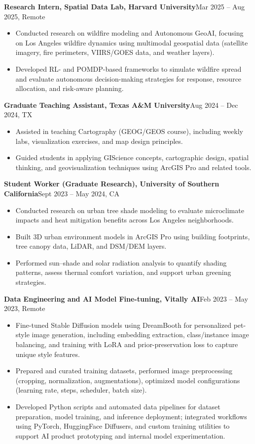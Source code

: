 \documentclass[10pt,letterpaper]{article}
\newcommand{\entry}[2]{%
  \par\vspace{0.30em}\noindent\textbf{#1}\hfill{\small #2}\par}
\newenvironment{tight}
  {\begin{itemize}[leftmargin=1.25em,itemsep=0.10em,topsep=0.20em,parsep=0pt,label=\textbullet]}
  {\end{itemize}}
\begin{document}
\entry{Research Intern, Spatial Data Lab, Harvard University}{Mar 2025 -- Aug 2025, Remote}
\begin{tight}
  \item Conducted research on wildfire modeling and Autonomous GeoAI, focusing on Los Angeles wildfire dynamics using multimodal geospatial data (satellite imagery, fire perimeters, VIIRS/GOES data, and weather layers).
  \item Developed RL- and POMDP-based frameworks to simulate wildfire spread and evaluate autonomous decision-making strategies for response, resource allocation, and risk-aware planning.
\end{tight}

\entry{Graduate Teaching Assistant, Texas A\&M University}{Aug 2024 -- Dec 2024, TX}
\begin{tight}
  \item Assisted in teaching Cartography (GEOG/GEOS course), including weekly labs, visualization exercises, and map design principles.
  \item Guided students in applying GIScience concepts, cartographic design, spatial thinking, and geovisualization techniques using ArcGIS Pro and related tools.
\end{tight}

\entry{Student Worker (Graduate Research), University of Southern California}{Sept 2023 -- May 2024, CA}
\begin{tight}
  \item Conducted research on urban tree shade modeling to evaluate microclimate impacts and heat mitigation benefits across Los Angeles neighborhoods.
  \item Built 3D urban environment models in ArcGIS Pro using building footprints, tree canopy data, LiDAR, and DSM/DEM layers.
  \item Performed sun--shade and solar radiation analysis to quantify shading patterns, assess thermal comfort variation, and support urban greening strategies.
\end{tight}

\entry{Data Engineering and AI Model Fine-tuning, Vitally AI}{Feb 2023 -- May 2023, Remote}
\begin{tight}
  \item Fine-tuned Stable Diffusion models using DreamBooth for personalized pet-style image generation, including embedding extraction, class/instance image balancing, and training with LoRA and prior-preservation loss to capture unique style features.
  \item Prepared and curated training datasets, performed image preprocessing (cropping, normalization, augmentations), optimized model configurations (learning rate, steps, scheduler, batch size).
  \item Developed Python scripts and automated data pipelines for dataset preparation, model training, and inference deployment; integrated workflows using PyTorch, HuggingFace Diffusers, and custom training utilities to support AI product prototyping and internal model experimentation.
\end{tight}
\end{document}
